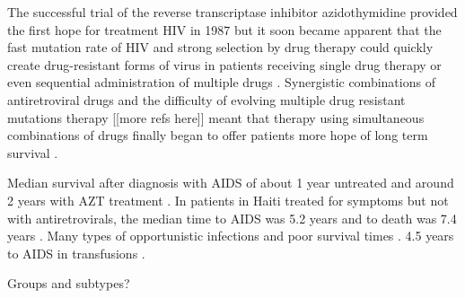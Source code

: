 \documentclass[../sherrill-Mix_thesis.tex]{subfiles}
\begin{document}
	The successful trial of the reverse transcriptase inhibitor azidothymidine provided the first hope for treatment HIV in 1987 \citep{Fischl1987,Fischl1989,Volberding1990} but it soon became apparent that the fast mutation rate of HIV \citep{Hahn1986,Preston1988,Roberts1988,Mansky1995,Mansky1996,Abram2010,Achuthan2014} and strong selection by drug therapy could quickly create drug-resistant forms of virus in patients receiving single drug therapy \citep{Larder1989,Larder1989a,Land1990,Boucher1990,Richman1990,Richman1991,Fitzgibbon1992,Richman1994,Schuurman1995,Schmit1996} or even sequential administration of multiple drugs \citep{Kahn1992,Abrams1994,deJong1994,Schmit1996a}. Synergistic combinations of antiretroviral drugs \citep{Dornsife1991,Johnson1991,Cox1994,Feng2009,Jilek2012,Kulkarni2014} and the difficulty of evolving multiple drug resistant mutations therapy \citep{Chow1993,Larder1995} [[more refs here]] meant that therapy using simultaneous combinations of drugs finally began to offer patients more hope of long term survival \citep{Collier1993,Eron1995,Collier1996,Hammer1996,Saravolatz1996,Darbyshire1996,Hammer1997,Gulick1997,Moore1999}.



	Median survival after diagnosis with AIDS of about 1 year untreated \citep{Rothenberg1987,Vella1992} and around 2 years with AZT treatment \citep{Creagh-Kirk1988,Fischl1989,Moore1992,Vella1992}. In patients in Haiti treated for symptoms but not with antiretrovirals, the median time to AIDS was 5.2 years and to death was 7.4 years \citep{Deschamps2000}. Many types of opportunistic infections and poor survival times \citep{Moore1996}. 4.5 years to AIDS in transfusions \citep{Lui1986}.

	Groups and subtypes?


	
\end{document}
